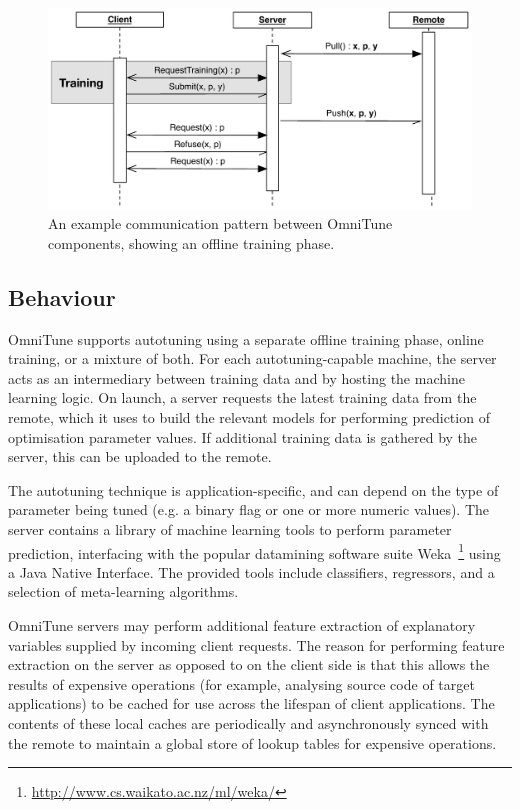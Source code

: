 \documentclass[nonatbib,preprint,9pt]{sigplanconf}
\begin{document}
\begin{figure}
\centering
\includegraphics[width=1.0\columnwidth]{img/omnitune-comms}
\caption{%
  An example communication pattern between OmniTune components,
  showing an offline training phase.%
}
\label{fig:omnitune-comms}
\end{figure}


\subsection{Behaviour}

OmniTune supports autotuning using a separate offline training phase,
online training, or a mixture of both. For each autotuning-capable
machine, the server acts as an intermediary between training data and
by hosting the machine learning logic. On launch, a server requests
the latest training data from the remote, which it uses to build the
relevant models for performing prediction of optimisation parameter
values. If additional training data is gathered by the server, this
can be uploaded to the remote.

The autotuning technique is application-specific, and can depend on
the type of parameter being tuned (e.g. a binary flag or one or more
numeric values). The server contains a library of machine learning
tools to perform parameter prediction, interfacing with the popular
datamining software suite
Weka~\footnote{\url{http://www.cs.waikato.ac.nz/ml/weka/}} using a
Java Native Interface. The provided tools include classifiers,
regressors, and a selection of meta-learning algorithms.

OmniTune servers may perform additional feature extraction of
explanatory variables supplied by incoming client requests. The reason
for performing feature extraction on the server as opposed to on the
client side is that this allows the results of expensive operations
(for example, analysing source code of target applications) to be
cached for use across the lifespan of client applications. The
contents of these local caches are periodically and asynchronously
synced with the remote to maintain a global store of lookup tables for
expensive operations.
\end{document}
